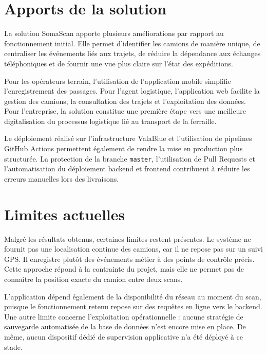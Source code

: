 \section*{Apports de la solution}
{}

La solution SomaScan apporte plusieurs améliorations par rapport au fonctionnement initial. Elle permet d'identifier les camions de manière unique, de centraliser les événements liés aux trajets, de réduire la dépendance aux échanges téléphoniques et de fournir une vue plus claire sur l'état des expéditions.

Pour les opérateurs terrain, l'utilisation de l'application mobile simplifie l'enregistrement des passages. Pour l'agent logistique, l'application web facilite la gestion des camions, la consultation des trajets et l'exploitation des données. Pour l'entreprise, la solution constitue une première étape vers une meilleure digitalisation du processus logistique lié au transport de la ferraille.

Le déploiement réalisé sur l'infrastructure ValaBlue et l'utilisation de pipelines GitHub Actions permettent également de rendre la mise en production plus structurée. La protection de la branche \texttt{master}, l'utilisation de Pull Requests et l'automatisation du déploiement backend et frontend contribuent à réduire les erreurs manuelles lors des livraisons.

\section*{Limites actuelles}
{}

Malgré les résultats obtenus, certaines limites restent présentes. Le système ne fournit pas une localisation continue des camions, car il ne repose pas sur un suivi GPS. Il enregistre plutôt des événements métier à des points de contrôle précis. Cette approche répond à la contrainte du projet, mais elle ne permet pas de connaître la position exacte du camion entre deux scans.

L'application dépend également de la disponibilité du réseau au moment du scan, puisque le fonctionnement retenu repose sur des requêtes en ligne vers le backend. Une autre limite concerne l'exploitation opérationnelle : aucune stratégie de sauvegarde automatisée de la base de données n'est encore mise en place. De même, aucun dispositif dédié de supervision applicative n'a été déployé à ce stade.

